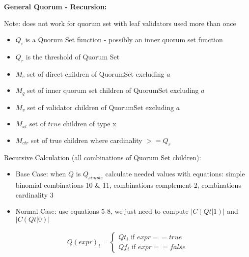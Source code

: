 \documentclass[10pt]{article}
\begin{document}
\newcommand{\powerset}[1]{\mathbb{P}(#1)}
\newcommand{\cardinality}[1]{\left\vert{#1}\right\vert}

\newcommand{\tgt}[0]{ \cardinality{ C(Qt|1) } }
\newcommand{\tgf}[0]{ \cardinality{ C(Qt|0) } }
\newcommand{\fgt}[0]{ \cardinality{ C(Qf|1) } }
\newcommand{\fgf}[0]{ \cardinality{ C(Qf|0) } }
\newcommand{\effected}[0]{ \tgt + \fgf - 2^m }

\setcounter{equation}{15}



\textbf{General Quorum - Recursion:}\\\par
Note: does not work for quorum set with leaf validators used more than once

\begin{itemize}
  \item $Q_i$ is a Quorum Set function - possibly an inner quorum set function
  \item $Q_{r}$ is the threshold of Quorum Set
  \item $M_{c}$ set of direct children of QuorumSet excluding $a$
  \item $M_{q}$ set of inner quorum set children of QuorumSet excluding $a$
  \item $M_{v}$ set of validator children of QuorumSet excluding $a$
  \item $M_{xt}$ set of $true$ children of type x
  \item $M_{ctr}$ set of true children where cardinality $>=Q_r$
\end{itemize}



Recursive Calculation (all combinations of Quorum Set children):
\begin{itemize}
  \item Base Case: when $Q$ is $Q_{simple}$ calculate needed values with equations:
    simple binomial combinations 10 \& 11,
    combinations complement 2,
    combinations cardinality 3
  \item Normal Case: use equations 5-8, we just need to compute
    $\cardinality{C(Qt|1)}$ and $\cardinality{C(Qt|0)}$
\end{itemize}


\begin{align}
  Q(expr)_i =
  \begin{cases}
    Qt_i \text{ if } expr==true \\
    Qf_i \text{ if } expr==false
  \end{cases}
\end{align}
\end{document}
